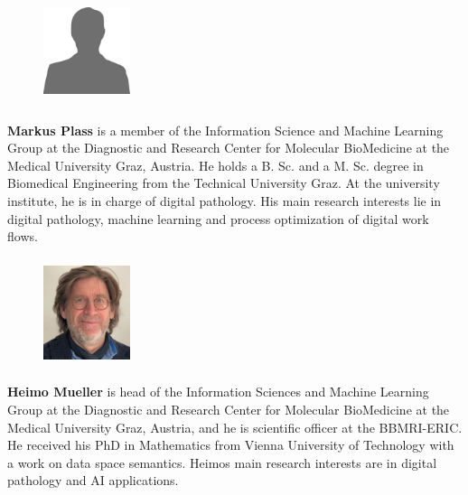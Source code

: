   
  \begin{figure} 
    \includegraphics[width=1in,height=1.25in,clip,keepaspectratio]{bio-images/dummy.jpg}
  \end{figure}\par
  \textbf{Markus Plass} is a member of the Information Science and Machine Learning Group at the Diagnostic and Research Center for Molecular BioMedicine at the Medical University Graz, Austria. He holds a B. Sc. and  a M. Sc. degree in Biomedical Engineering from the Technical University Graz. At the university institute, he is in charge of digital pathology. His main research interests lie in digital pathology, machine learning and process optimization of digital work flows.\par

%  

 \begin{figure} 
    \includegraphics[width=1in,height=1.25in,clip,keepaspectratio]{bio-images/mueller.JPG}
  \end{figure}\par
  \textbf{Heimo Mueller} is head of the Information Sciences and Machine Learning Group at the Diagnostic and Research Center for Molecular BioMedicine at the Medical University Graz, Austria, and he is scientific officer at the BBMRI-ERIC. He received his PhD in Mathematics from Vienna University of Technology with a work on data space semantics. Heimos main research interests are in digital pathology and AI applications.\par



